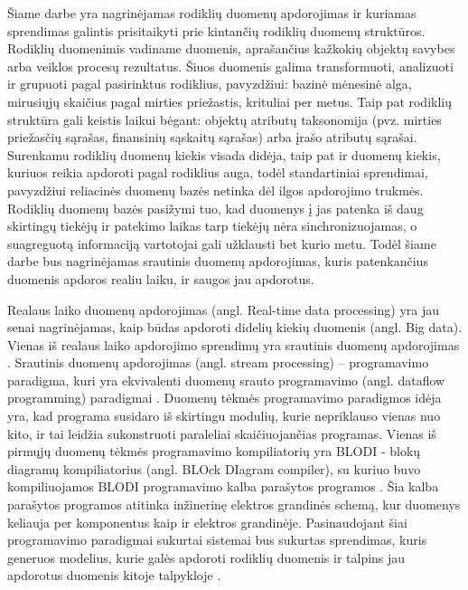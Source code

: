 \documentclass{VUMIFPSbakalaurinis}
\begin{document}
\tableofcontents

 
Šiame darbe yra nagrinėjamas rodiklių duomenų apdorojimas ir kuriamas sprendimas galintis prisitaikyti prie kintančių rodiklių duomenų struktūros. Rodiklių duomenimis vadiname duomenis, aprašančius kažkokių objektų savybes arba veiklos procesų rezultatus. Šiuos duomenis galima transformuoti, analizuoti ir grupuoti pagal pasirinktus rodiklius, pavyzdžiui: bazinė mėnesinė alga, mirusiųjų skaičius pagal mirties priežastis, krituliai per metus. Taip pat rodiklių struktūra gali keistis laikui bėgant: objektų atributų taksonomija (pvz. mirties priežasčių sąrašas, finansinių sąskaitų sąrašas) arba įrašo atributų sąrašai. Surenkamu rodiklių duomenų kiekis visada didėja, taip pat ir duomenų kiekis, kuriuos reikia apdoroti pagal rodiklius auga, todėl standartiniai sprendimai, pavyzdžiui reliacinės duomenų bazės netinka dėl ilgos apdorojimo trukmės. Rodiklių duomenų bazės pasižymi tuo, kad duomenys į jas patenka iš daug skirtingų tiekėjų ir patekimo laikas tarp tiekėjų nėra sinchronizuojamas, o suagreguotą informaciją vartotojai gali užklausti bet kurio metu. Todėl šiame darbe bus nagrinėjamas srautinis duomenų apdorojimas, kuris patenkančius duomenis apdoros realiu laiku, ir saugos jau apdorotus.  \par
Realaus laiko duomenų apdorojimas (angl. Real-time data processing) yra jau senai nagrinėjamas, kaip būdas apdoroti didelių kiekių duomenis (angl. Big data). Vienas iš realaus laiko apdorojimo sprendimų yra srautinis duomenų apdorojimas \cite{BigData, StreamProcessingInData}. Srautinis duomenų apdorojimas (angl. stream processing) – programavimo paradigma, kuri yra ekvivalenti duomenų srauto programavimo (angl. dataflow programming) paradigmai \cite{shortstreamproc}. 
Duomenų tėkmės programavimo paradigmos idėja yra, kad programa susidaro iš skirtingu modulių, kurie nepriklauso vienas nuo kito, ir tai leidžia sukonstruoti paraleliai skaičiuojančias programas. 
Vienas iš pirmųjų duomenų tėkmės programavimo kompiliatorių yra BLODI - blokų diagramų kompiliatorius (angl. BLOck DIagram compiler), su kuriuo buvo kompiliuojamos BLODI programavimo kalba parašytos programos \cite{kelly1961block}.  Šia kalba parašytos programos atitinka inžinerinę elektros grandinės schemą, kur duomenys keliauja per komponentus kaip ir elektros grandinėje. Pasinaudojant šiai programavimo paradigmai sukurtai sistemai bus sukurtas sprendimas, kuris generuos modelius, kurie galės apdoroti rodiklių duomenis ir talpins jau apdorotus duomenis kitoje talpykloje \cite{8Requirements}. 
\end{document}

